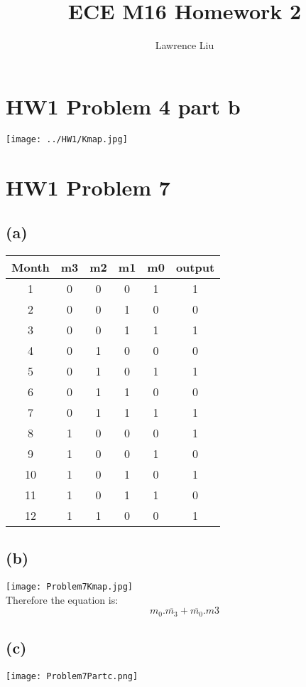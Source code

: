\documentclass[12pt]{article}
\title{ECE M16 Homework 2}
\author{Lawrence Liu}
\begin{document}
\maketitle
\section*{HW1 Problem  4 part b}
\texttt{[image: ../HW1/Kmap.jpg]}
\section*{HW1 Problem 7}
\subsection*{(a)}
\begin{center}
    \begin{tabular}{|c|c|c|c|c|c|}
        Month & m3 & m2 & m1 & m0 & output \\
        \hline
        1 & 0 & 0 & 0 & 1 & 1 \\
        \hline
        2 & 0 & 0 & 1 & 0 & 0 \\
        \hline
        3 & 0 & 0 & 1 & 1 & 1 \\
        \hline
        4 & 0 & 1 & 0 & 0 & 0 \\
        \hline
        5 & 0 & 1 & 0 & 1 & 1 \\
        \hline
        6 & 0 & 1 & 1 & 0 & 0 \\
        \hline
        7 & 0 & 1 & 1 & 1 & 1 \\
        \hline
        8 & 1 & 0 & 0 & 0 & 1 \\
        \hline
        9 & 1 & 0 & 0 & 1 & 0 \\
        \hline
        10 & 1 & 0 & 1 & 0 & 1 \\
        \hline
        11 & 1 & 0 & 1 & 1 & 0 \\
        \hline
        12 & 1 & 1 & 0 & 0 & 1 \\
        \hline
    \end{tabular}
\end{center}
\subsection*{(b)}
\texttt{[image: Problem7Kmap.jpg]}\\
Therefore the equation is:
$$\boxed{m_0.\overline{m_3}+\overline{m_0}.m3}$$
\subsection*{(c)}
\texttt{[image: Problem7Partc.png]}
\end{document}
